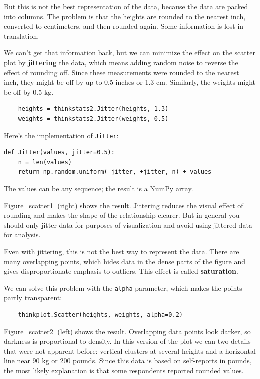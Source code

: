 \documentclass[12pt]{book}
\begin{document}
But this is not the best representation of
the data, because the data are packed into columns.  The problem is
that the heights are rounded to the nearest inch, converted to
centimeters, and then rounded again.  Some information is lost in
translation.    

We can't get that information back, but we can minimize the effect on
the scatter plot by {\bf jittering} the data, which means adding random
noise to reverse the effect of rounding off.  Since these measurements
were rounded to the nearest inch, they might be off by up to 0.5 inches or
1.3 cm.  Similarly, the weights might be off by 0.5 kg.
%
\begin{verbatim}
    heights = thinkstats2.Jitter(heights, 1.3)
    weights = thinkstats2.Jitter(weights, 0.5)
\end{verbatim}

Here's the implementation of {\tt Jitter}:

\begin{verbatim}
def Jitter(values, jitter=0.5):
    n = len(values)
    return np.random.uniform(-jitter, +jitter, n) + values
\end{verbatim}

The values can be any sequence; the result is a NumPy array.

Figure~\ref{scatter1} (right) shows the result.  Jittering reduces the
visual effect of rounding and makes the shape of the relationship
clearer.  But in general you should only jitter data for purposes of
visualization and avoid using jittered data for analysis.

Even with jittering, this is not the best way to represent the data.
There are many overlapping points, which hides data
in the dense parts of the figure and gives disproportionate emphasis
to outliers.  This effect is called {\bf saturation}.

We can solve this problem with the {\tt alpha} parameter, which makes
the points partly transparent:
%
\begin{verbatim}
    thinkplot.Scatter(heights, weights, alpha=0.2)
\end{verbatim}
%
Figure~\ref{scatter2} (left) shows the result.  Overlapping data
points look darker, so darkness is proportional to density.  In this
version of the plot we can two details that were not apparent before:
vertical clusters at several heights and a horizontal line near 90 kg
or 200 pounds.  Since this data is based on self-reports in pounds,
the most likely explanation is that some respondents reported
rounded values.
\end{document}
